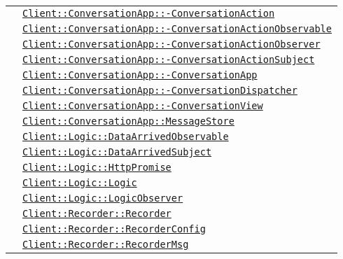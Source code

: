 \begin{longtable}{|>{\centering}m{3cm}|m{10cm}<{\centering}|}
& \hyperref[Client::ConversationApp::ConversationAction]{\texttt{Client::ConversationApp::-\linebreak ConversationAction}}\\
& \hyperref[Client::ConversationApp::ConversationActionObservable]{\texttt{Client::ConversationApp::-\linebreak ConversationActionObservable}}\\
& \hyperref[Client::ConversationApp::ConversationActionObserver]{\texttt{Client::ConversationApp::-\linebreak ConversationActionObserver}}\\
& \hyperref[Client::ConversationApp::ConversationActionSubject]{\texttt{Client::ConversationApp::-\linebreak ConversationActionSubject}}\\
& \hyperref[Client::ConversationApp::ConversationApp]{\texttt{Client::ConversationApp::-\linebreak ConversationApp}}\\
& \hyperref[Client::ConversationApp::ConversationDispatcher]{\texttt{Client::ConversationApp::-\linebreak ConversationDispatcher}}\\
& \hyperref[Client::ConversationApp::ConversationView]{\texttt{Client::ConversationApp::-\linebreak ConversationView}}\\
& \hyperref[Client::ConversationApp::MessageStore]{\texttt{Client::ConversationApp::MessageStore}}\\
& \hyperref[Client::Logic::DataArrivedObservable]{\texttt{Client::Logic::DataArrivedObservable}}\\
& \hyperref[Client::Logic::DataArrivedSubject]{\texttt{Client::Logic::DataArrivedSubject}}\\
& \hyperref[Client::Logic::HttpPromise]{\texttt{Client::Logic::HttpPromise}}\\
& \hyperref[Client::Logic::Logic]{\texttt{Client::Logic::Logic}}\\
& \hyperref[Client::Logic::LogicObserver]{\texttt{Client::Logic::LogicObserver}}\\
& \hyperref[Client::Recorder::Recorder]{\texttt{Client::Recorder::Recorder}}\\
& \hyperref[Client::Recorder::RecorderConfig]{\texttt{Client::Recorder::RecorderConfig}}\\
& \hyperref[Client::Recorder::RecorderMsg]{\texttt{Client::Recorder::RecorderMsg}}\\

\end{longtable}
